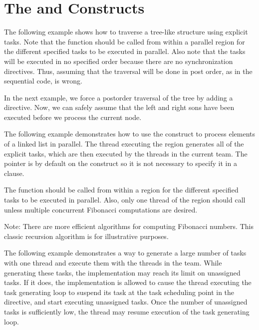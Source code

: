 \pagebreak
\section{The  and  Constructs}
\label{sec:task_taskwait}

The following example shows how to traverse a tree-like structure using explicit 
tasks. Note that the  function should be called from within a 
parallel region for the different specified tasks to be executed in parallel. Also 
note that the tasks will be executed in no specified order because there are no 
synchronization directives. Thus, assuming that the traversal will be done in post 
order, as in the sequential code, is wrong.



In the next example, we force a postorder traversal of the tree by adding a  
directive. Now, we can safely assume that the left and right sons have been executed 
before we process the current node.



The following example demonstrates how to use the  construct to process 
elements of a linked list in parallel. The thread executing the  
region generates all of the explicit tasks, which are then executed by the threads 
in the current team. The pointer  is  by default 
on the  construct so it is not necessary to specify it in a  
clause.



The  function should be called from within a   region 
for the different specified tasks to be executed in parallel. Also, only one thread 
of the  region should call  unless multiple concurrent 
Fibonacci computations are desired. 


\clearpage

Note: There are more efficient algorithms for computing Fibonacci numbers. This 
classic recursion algorithm is for illustrative purposes.

The following example demonstrates a way to generate a large number of tasks with 
one thread and execute them with the threads in the team. While generating these 
tasks, the implementation may reach its limit on unassigned tasks.  If it does, 
the implementation is allowed to cause the thread executing the task generating 
loop to suspend its task at the task scheduling point in the  directive, 
and start executing unassigned tasks.  Once the number of unassigned tasks is sufficiently 
low, the thread may resume execution of the task generating loop.

